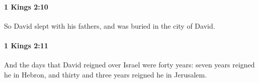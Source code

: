 		\paragraph{1 Kings 2:10} %
			\label{1KINGS-2-10}

			So David slept with his fathers, and was buried in the city of David.


		\paragraph{1 Kings 2:11} %
			\label{1KINGS-2-11}

			And the days that David reigned over Israel were forty years: seven years reigned he in Hebron, and thirty and three years reigned he in Jerusalem.


